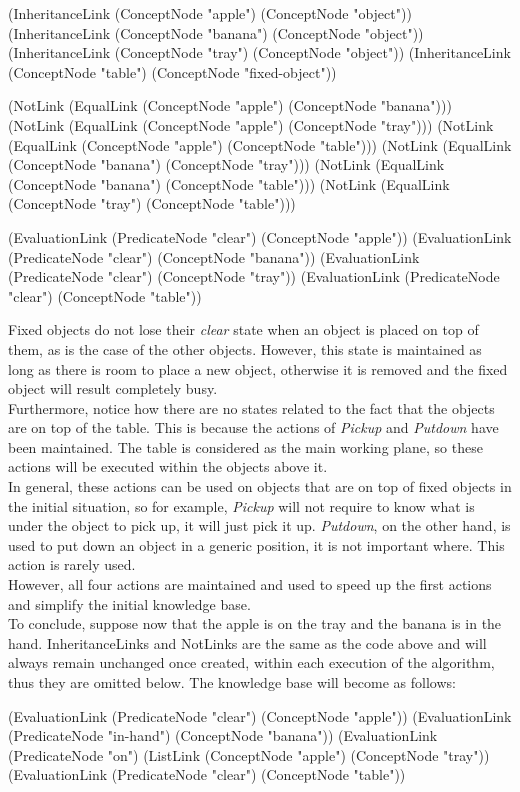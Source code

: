 \begin{python}
	(InheritanceLink
		(ConceptNode "apple")
		(ConceptNode "object"))
	(InheritanceLink
		(ConceptNode "banana")
		(ConceptNode "object"))
	(InheritanceLink
		(ConceptNode "tray")
		(ConceptNode "object"))
	(InheritanceLink
		(ConceptNode "table")
		(ConceptNode "fixed-object"))

	(NotLink (EqualLink 
		(ConceptNode "apple") (ConceptNode "banana")))
	(NotLink (EqualLink 
		(ConceptNode "apple") (ConceptNode "tray")))
	(NotLink (EqualLink 
		(ConceptNode "apple") (ConceptNode "table")))
	(NotLink (EqualLink 
		(ConceptNode "banana") (ConceptNode "tray")))
	(NotLink (EqualLink 
		(ConceptNode "banana") (ConceptNode "table")))
	(NotLink (EqualLink 
		(ConceptNode "tray") (ConceptNode "table")))
	
	(EvaluationLink
		(PredicateNode "clear")
		(ConceptNode "apple"))
	(EvaluationLink
		(PredicateNode "clear")
		(ConceptNode "banana"))
	(EvaluationLink
		(PredicateNode "clear")
		(ConceptNode "tray"))
	(EvaluationLink
		(PredicateNode "clear")
		(ConceptNode "table"))
\end{python}

Fixed objects do not lose their \textit{clear} state when an object is placed on top of them, as is the case of the other objects. However, this state is maintained as long as there is room to place a new object, otherwise it is removed and the fixed object will result completely busy. \\
Furthermore, notice how there are no states related to the fact that the objects are on top of the table. This is because the actions of \textit{Pickup} and \textit{Putdown} have been maintained. The table is considered as the main working plane, so these actions will be executed within the objects above it. \\
In general, these actions can be used on objects that are on top of fixed objects in the initial situation, so for example, \textit{Pickup} will not require to know what is under the object to pick up, it will just pick it up. \textit{Putdown}, on the other hand, is used to put down an object in a generic position, it is not important where. This action is rarely used. \\
However, all four actions are maintained and used to speed up the first actions and simplify the initial knowledge base.\\

To conclude, suppose now that the apple is on the tray and the banana is in the hand. InheritanceLinks and NotLinks are the same as the code above and will always remain unchanged once created, within each execution of the algorithm, thus they are omitted below. The knowledge base will become as follows: \\

\begin{python}	
	(EvaluationLink
		(PredicateNode "clear")
		(ConceptNode "apple"))
	(EvaluationLink
		(PredicateNode "in-hand")
		(ConceptNode "banana"))
	(EvaluationLink
		(PredicateNode "on")
		(ListLink
			(ConceptNode "apple")
			(ConceptNode "tray"))
	(EvaluationLink
		(PredicateNode "clear")
		(ConceptNode "table"))
\end{python}